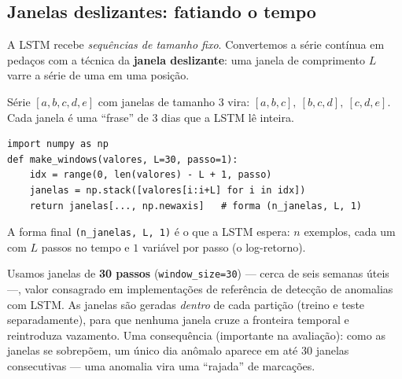 \subsection{Janelas deslizantes: fatiando o tempo}
A LSTM recebe \emph{sequências de tamanho fixo}. Convertemos a série contínua em
pedaços com a técnica da \textbf{janela deslizante}: uma janela de comprimento
$L$ varre a série de uma em uma posição.

\begin{exemplo}
Série $[a,b,c,d,e]$ com janelas de tamanho 3 vira:
$[a,b,c],\ [b,c,d],\ [c,d,e]$. Cada janela é uma ``frase'' de 3 dias que a LSTM
lê inteira.
\end{exemplo}

\begin{lstlisting}[caption={Gerando janelas de tamanho fixo a partir de um vetor 1D.}]
import numpy as np
def make_windows(valores, L=30, passo=1):
    idx = range(0, len(valores) - L + 1, passo)
    janelas = np.stack([valores[i:i+L] for i in idx])
    return janelas[..., np.newaxis]   # forma (n_janelas, L, 1)
\end{lstlisting}

A forma final \texttt{(n\_janelas, L, 1)} é o que a LSTM espera: $n$ exemplos, cada
um com $L$ passos no tempo e $1$ variável por passo (o log-retorno).

\begin{naprat}
Usamos janelas de \textbf{30 passos} (\texttt{window\_size=30}) --- cerca de seis
semanas úteis ---, valor consagrado em implementações de referência de detecção
de anomalias com LSTM. As janelas são geradas \emph{dentro} de cada partição
(treino e teste separadamente), para que nenhuma janela cruze a fronteira
temporal e reintroduza vazamento. Uma consequência (importante na avaliação): como
as janelas se sobrepõem, um único dia anômalo aparece em até 30 janelas
consecutivas --- uma anomalia vira uma ``rajada'' de marcações.
\end{naprat}
